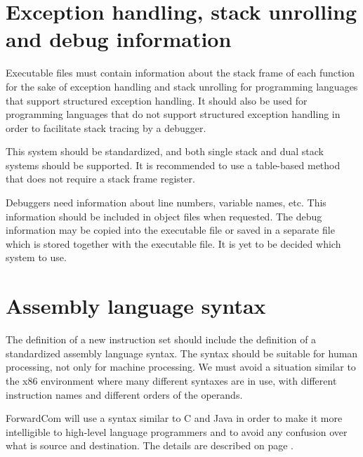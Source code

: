 \documentclass[forwardcom.tex]{subfiles}
\begin{document}
\section{Exception handling, stack unrolling and debug information} \label{exceptionHandling}
Executable files must contain information about the stack frame of each function for the sake of exception handling and stack unrolling for programming languages that support structured exception handling. 
It should also be used for programming languages that do not support structured exception handling in order to facilitate stack tracing by a debugger. 
\vspace{2mm}

This system should be standardized, and both single stack and dual stack systems should be supported. 
It is recommended to use a table-based method that does not require a stack frame register. 
\vspace{2mm}

Debuggers need information about line numbers, variable names, etc. This information should be included in object files when requested. The debug information may be copied into the executable file or saved in a separate file which is stored together with the executable file. It is yet to be decided which system to use. 


\section{Assembly language syntax} \label{assemblySyntax}
The definition of a new instruction set should include the definition of a standardized assembly language syntax. The syntax should be suitable for human processing, not only for machine processing. We must avoid a situation similar to the x86 environment where many different syntaxes are in use, with different instruction names and different orders of the operands. 
\vspace{2mm}

ForwardCom will use a syntax similar to C and Java in order to make it more intelligible to high-level language programmers and to avoid any confusion over what is source and destination. 
The details are described on page \pageref{assemblerCommandLine}.
\end{document}
